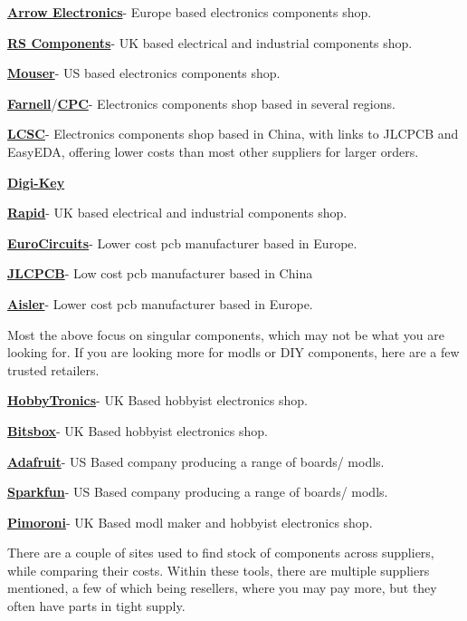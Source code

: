 \documentclass[a4paper,11pt]{report}
\let\oldhref\href %
\renewcommand{\href}[2]{\oldhref{#1}{\bfseries#2}}
\begin{document}
\href{https://www.arrow.com/}{Arrow Electronics}- Europe based electronics components shop.

\href{https://uk.rs-online.com/}{RS Components}- UK based electrical and industrial components shop.

\href{https://www.mouser.co.uk/}{Mouser}- US based electronics components shop.

\href{https://uk.farnell.com/}{Farnell}/\href{https://cpc.farnell.com/}{CPC}- Electronics components shop based in several regions.

\href{https://lcsc.com/}{LCSC}- Electronics components shop based in China, with links to JLCPCB and EasyEDA, offering lower costs than most other suppliers for larger orders.

\href{https://www.digikey.co.uk/}{Digi-Key}

\href{https://www.rapidonline.com/}{Rapid}- UK based electrical and industrial components shop.

\href{https://www.eurocircuits.com/}{EuroCircuits}- Lower cost \gls{pcb} manufacturer based in Europe.

\href{https://jlcpcb.com/}{JLCPCB}- Low cost \gls{pcb} manufacturer based in China

\href{https://aisler.net/}{Aisler}- Lower cost \gls{pcb} manufacturer based in Europe.


Most the above focus on singular components, which may not be what you are looking for. If you are looking more for \gls{modl}s or DIY components, here are a few trusted retailers.

\href{https://www.hobbytronics.co.uk/}{HobbyTronics}- UK Based hobbyist electronics shop.

\href{https://www.bitsbox.co.uk/}{Bitsbox}- UK Based hobbyist electronics shop.

\href{https://www.adafruit.com/}{Adafruit}- US Based company producing a range of boards/ \gls{modl}s.

\href{https://www.sparkfun.com/}{Sparkfun}- US Based company producing a range of boards/ \gls{modl}s.

\href{https://shop.pimoroni.com/}{Pimoroni}- UK Based \gls{modl} maker and hobbyist electronics shop.


There are a couple of sites used to find stock of components across suppliers, while comparing their costs. Within these tools, there are multiple suppliers mentioned, a few of which being resellers, where you may pay more, but they often have parts in tight supply.
\end{document}
